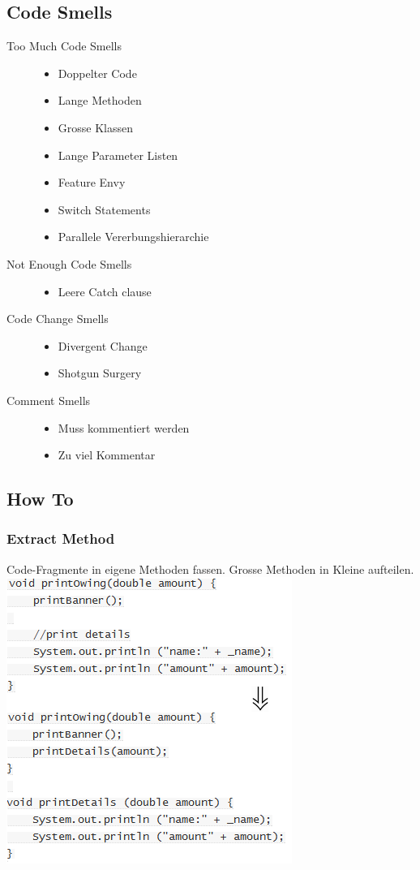 \documentclass[a4paper,10pt]{article}
\begin{document}
\subsection{Code Smells}
\begin{description}
	\item[Too Much Code Smells] \hfill
		\begin{itemize}
			\item Doppelter Code
			\item Lange Methoden
			\item Grosse Klassen
			\item Lange Parameter Listen
			\item Feature Envy
			\item Switch Statements
			\item Parallele Vererbungshierarchie
		\end{itemize}
	\item[Not Enough Code Smells] \hfill 
		\begin{itemize}
			\item Leere Catch clause
		\end{itemize}
	\item[Code Change Smells] \hfill
		\begin{itemize}
			\item Divergent Change
			\item Shotgun Surgery	
		\end{itemize}
	\item[Comment Smells] \hfill 
		\begin{itemize}
			\item Muss kommentiert werden
			\item Zu viel Kommentar
		\end{itemize}
\end{description}

\subsection{How To}
\subsubsection{Extract Method}
Code-Fragmente in eigene Methoden fassen. Grosse Methoden in Kleine aufteilen.\\
\includegraphics[scale=.6]{refactoring_1.png}
\end{document}
